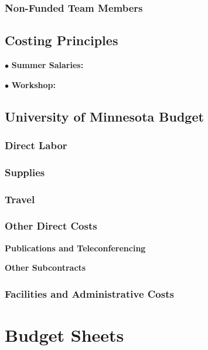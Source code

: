 \documentclass[12pt]{article}
\begin{document}
\subsubsection{Non-Funded Team Members}


\subsection{Costing Principles}
\label{sec:cost_principles}


$\bullet$ \hspace{0.2in} {\bf Summer Salaries:} 


$\bullet$ \hspace{0.2in} {\bf Workshop:} 


        \subsection{University of Minnesota Budget}


            \subsubsection{Direct Labor} 


            \subsubsection{Supplies} 

  
            \subsubsection{Travel} 


   \subsubsection{Other Direct Costs} 

{\bf Publications and Teleconferencing} \hspace{0.1in} 


{\bf Other Subcontracts} \hspace{0.1in} 

   \subsubsection{Facilities and Administrative Costs} 


\newpage

\section{Budget Sheets}
\end{document}
